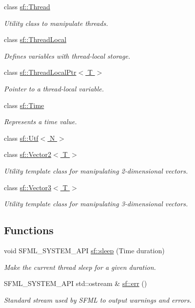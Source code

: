 \begin{DoxyCompactItemize}
class \hyperlink{classsf_1_1_thread}{sf\+::\+Thread}
\begin{DoxyCompactList}\small\item\em Utility class to manipulate threads. \end{DoxyCompactList}\item 
class \hyperlink{classsf_1_1_thread_local}{sf\+::\+Thread\+Local}
\begin{DoxyCompactList}\small\item\em Defines variables with thread-\/local storage. \end{DoxyCompactList}\item 
class \hyperlink{classsf_1_1_thread_local_ptr}{sf\+::\+Thread\+Local\+Ptr$<$ T $>$}
\begin{DoxyCompactList}\small\item\em Pointer to a thread-\/local variable. \end{DoxyCompactList}\item 
class \hyperlink{classsf_1_1_time}{sf\+::\+Time}
\begin{DoxyCompactList}\small\item\em Represents a time value. \end{DoxyCompactList}\item 
class \hyperlink{singletonsf_1_1_utf}{sf\+::\+Utf$<$ N $>$}
\item 
class \hyperlink{classsf_1_1_vector2}{sf\+::\+Vector2$<$ T $>$}
\begin{DoxyCompactList}\small\item\em Utility template class for manipulating 2-\/dimensional vectors. \end{DoxyCompactList}\item 
class \hyperlink{classsf_1_1_vector3}{sf\+::\+Vector3$<$ T $>$}
\begin{DoxyCompactList}\small\item\em Utility template class for manipulating 3-\/dimensional vectors. \end{DoxyCompactList}\end{DoxyCompactItemize}
\subsection*{Functions}
\begin{DoxyCompactItemize}
\item 
void S\+F\+M\+L\+\_\+\+S\+Y\+S\+T\+E\+M\+\_\+\+A\+P\+I \hyperlink{group__system_ga2f2620831533dee0ed432ed982342e09}{sf\+::sleep} (Time duration)
\begin{DoxyCompactList}\small\item\em Make the current thread sleep for a given duration. \end{DoxyCompactList}\item 
S\+F\+M\+L\+\_\+\+S\+Y\+S\+T\+E\+M\+\_\+\+A\+P\+I std\+::ostream \& \hyperlink{group__system_ga7fe7f475639e26334606b5142c29551f}{sf\+::err} ()
\begin{DoxyCompactList}\small\item\em Standard stream used by S\+F\+M\+L to output warnings and errors. \end{DoxyCompactList}\end{DoxyCompactItemize}


